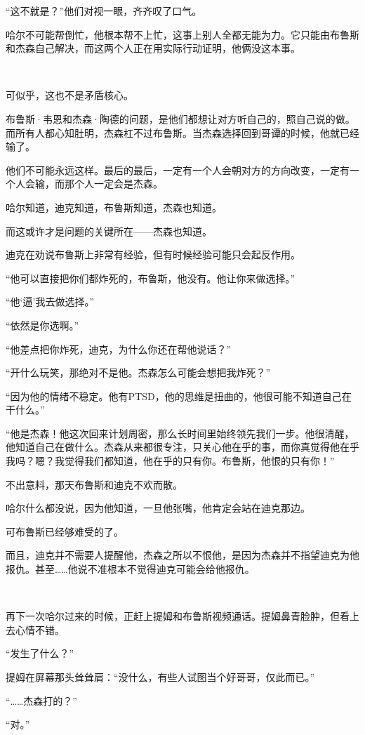 \documentclass[../main]{subfiles}
\begin{document}
“这不就是？”他们对视一眼，齐齐叹了口气。

哈尔不可能帮倒忙，他根本帮不上忙，这事上别人全都无能为力。它只能由布鲁斯和杰森自己解决，而这两个人正在用实际行动证明，他俩没这本事。

~\

可似乎，这也不是矛盾核心。

布鲁斯·韦恩和杰森·陶德的问题，是他们都想让对方听自己的，照自己说的做。而所有人都心知肚明，杰森杠不过布鲁斯。当杰森选择回到哥谭的时候，他就已经输了。

他们不可能永远这样。最后的最后，一定有一个人会朝对方的方向改变，一定有一个人会输，而那个人一定会是杰森。

哈尔知道，迪克知道，布鲁斯知道，杰森也知道。

而这或许才是问题的关键所在——杰森也知道。

迪克在劝说布鲁斯上非常有经验，但有时候经验可能只会起反作用。

“他可以直接把你们都炸死的，布鲁斯，他没有。他让你来做选择。”

“他‘逼’我去做选择。”

“依然是你选啊。”

“他差点把你炸死，迪克，为什么你还在帮他说话？”

“开什么玩笑，那绝对不是他。杰森怎么可能会想把我炸死？”

“因为他的情绪不稳定。他有PTSD，他的思维是扭曲的，他很可能不知道自己在干什么。”

“他是杰森！他这次回来计划周密，那么长时间里始终领先我们一步。他很清醒，他知道自己在做什么。杰森从来都很专注，只关心他在乎的事，而你真觉得他在乎我吗？嗯？我觉得我们都知道，他在乎的只有你。布鲁斯，他恨的只有你！”

不出意料，那天布鲁斯和迪克不欢而散。

哈尔什么都没说，因为他知道，一旦他张嘴，他肯定会站在迪克那边。

可布鲁斯已经够难受的了。

而且，迪克并不需要人提醒他，杰森之所以不恨他，是因为杰森并不指望迪克为他报仇。甚至……他说不准根本不觉得迪克可能会给他报仇。

~\

再下一次哈尔过来的时候，正赶上提姆和布鲁斯视频通话。提姆鼻青脸肿，但看上去心情不错。

“发生了什么？”

提姆在屏幕那头耸耸肩：“没什么，有些人试图当个好哥哥，仅此而已。”

“……杰森打的？”

“对。”
\end{document}
